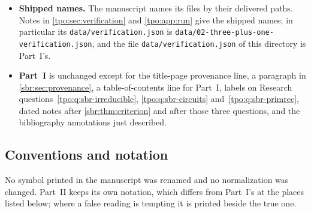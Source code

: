 \documentclass[11pt,letterpaper]{article}
\numberwithin{equation}{section}
\theoremstyle{definition}
\theoremstyle{remark}
\newcommand{\Edges}{\mathcal E}
\newcommand{\src}[1]{\texttt{\nolinkurl{#1}}}
\newcommand{\tpoM}{\mathcal M}
\newcommand{\tpoT}{\mathcal T}
\newcommand{\tpopin}{\texttt{e47ed8547bd021f9bd85bdcf767c94a2fcb41001}}
\begin{document}
\begin{itemize}
\verb|\pin| are \verb|\tpoM|, \verb|\tpoT| and \verb|\tpopin| here, and its
\verb|\E| is Part~I's \verb|\Edges|; the printed symbols are unchanged. Its
four unused operator declarations were not carried over. The
\src{listings} package was added for its two code listings.
\item \textbf{Shipped names.} The manuscript names its files by their
delivered paths. Notes in \cref{tpo:sec:verification} and
\cref{tpo:app:run} give the shipped names; in particular its
\src{data/verification.json} is \src{data/02-three-plus-one-verification.json},
and the file \src{data/verification.json} of this directory is Part~I's.
\item \textbf{Part~I} is unchanged except for the title-page provenance line,
a paragraph in \cref{sbr:sec:provenance}, a table-of-contents line for
Part~I, labels on Research
questions~\ref{tpo:q:sbr-irreducible}, \ref{tpo:q:sbr-circuits}
and~\ref{tpo:q:sbr-primrec}, dated notes after \cref{sbr:thm:criterion} and
after those three questions, and the bibliography annotations just
described.
\end{itemize}

\subsection{Conventions and notation}
\label{tpo:sec:notation}

No symbol printed in the manuscript was renamed and no normalization was
changed. Part~II keeps its own notation, which differs from Part~I's at the
places listed below; where a false reading is tempting it is printed beside
the true one.
\end{document}
